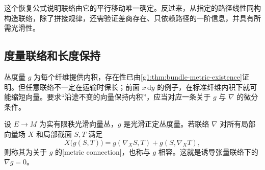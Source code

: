 \ProseParagraphBreak

这个恢复公式说明联络由它的平行移动唯一确定。反过来，从指定的路径线性同构构造联络，除了拼接规律，还需验证差商存在、只依赖路径的一阶信息，并具有所需光滑性。

\subsection{度量联络和长度保持}
\label{g1:subsec:1502:04}

丛度量 \(g\) 为每个纤维提供内积，存在性已由\cref{g1:thm:bundle-metric-existence}证明。但任意联络不一定在运输时保长；前面 \(x\,\mathrm{d}y\) 的例子，在标准纤维内积下就可能缩短向量。要求“沿途不变的向量保持内积”，应当对应一条关于 \(g\) 与 \(\nabla\) 的微分条件。

\begin{definition}\label{g1:def:metric-connection}
	设 \(E\to M\) 为实有限秩光滑向量丛，\(g\) 是光滑正定丛度量。若联络 \(\nabla\) 对所有局部向量场 \(X\) 和局部截面 \(S,T\) 满足
	\[
		X\bigl(g(S,T)\bigr)=g(\nabla_XS,T)+g(S,\nabla_XT),
	\]
	则称其为关于 \(g\) 的[metric connection]，也称与 \(g\) 相容。这就是诱导张量联络下的 \(\nabla g=0\)。
\end{definition}

